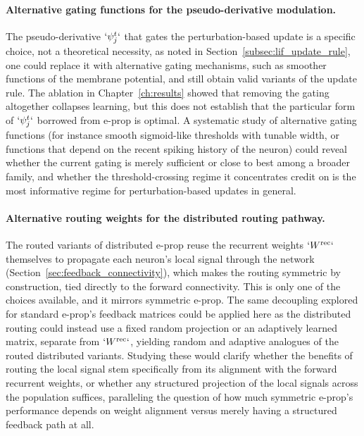 \paragraph{Alternative gating functions for the pseudo-derivative modulation.}
The pseudo-derivative $`\psi_j^t`$ that gates the perturbation-based update
is a specific choice, not a theoretical necessity, as noted in
Section~\ref{subsec:lif_update_rule}, one could replace
it with alternative gating mechanisms, such as smoother functions of the
membrane potential, and still obtain valid variants of the update rule. The
ablation in Chapter~\ref{ch:results} showed that removing the gating
altogether collapses learning, but this does not establish that the
particular form of $`\psi_j^t`$ borrowed from e-prop is optimal. A
systematic study of alternative gating functions (for instance smooth
sigmoid-like thresholds with tunable width, or functions that depend on
the recent spiking history of the neuron) could reveal whether the current gating is merely
sufficient or close to best among a broader family, and whether the
threshold-crossing regime it concentrates credit on is the most informative
regime for perturbation-based updates in general.

\paragraph{Alternative routing weights for the distributed routing pathway.}
The routed variants of distributed e-prop reuse the recurrent weights
$`W^{\mathrm{rec}}`$ themselves to propagate each neuron's local signal through
the network (Section~\ref{sec:feedback_connectivity}), which makes the routing
symmetric by construction, tied directly to the forward connectivity. This is
only one of the choices available, and it mirrors symmetric e-prop. The same
decoupling explored for standard e-prop's feedback matrices could be applied
here as the distributed routing could instead use a fixed random projection or an
adaptively learned matrix, separate from $`W^{\mathrm{rec}}`$, yielding random
and adaptive analogues of the routed distributed variants. Studying these would
clarify whether the benefits of routing the local signal stem specifically from
its alignment with the forward recurrent weights, or whether any structured
projection of the local signals across the population suffices, paralleling the
question of how much symmetric e-prop's performance depends on weight alignment
versus merely having a structured feedback path at all.

